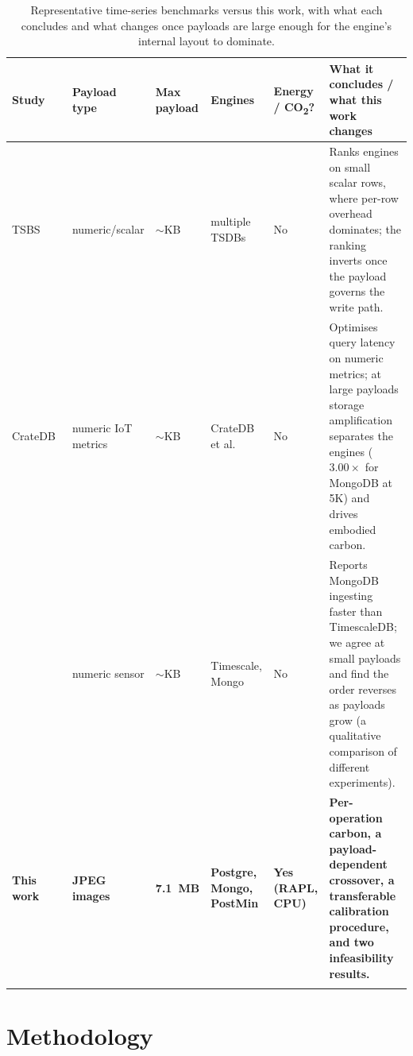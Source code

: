 \documentclass[pdflatex,sn-basic]{sn-jnl}%
\begin{document}
\begin{table}[htbp]
\caption{Representative time-series benchmarks versus this work, with what each concludes and what changes once payloads are large enough for the engine's internal layout to dominate.}\label{tab:relwork}
\footnotesize
\setlength{\tabcolsep}{3pt}
\begin{tabular}{@{}L{0.155\textwidth}L{0.115\textwidth}L{0.065\textwidth}L{0.115\textwidth}L{0.075\textwidth}L{0.315\textwidth}@{}}
\toprule
Study & Payload type & Max payload & Engines & Energy / CO\textsubscript{2}? & What it concludes / what this work changes \\
\midrule
TSBS~\citep{tsbs} & numeric/scalar & $\sim$KB & multiple TSDBs & No & Ranks engines on small scalar rows, where per-row overhead dominates; the ranking inverts once the payload governs the write path. \\
CrateDB~\citep{cratedb_ts_benchmark} & numeric IoT metrics & $\sim$KB & CrateDB et al. & No & Optimises query latency on numeric metrics; at large payloads storage amplification separates the engines ($3.00\times$ for MongoDB at 5K) and drives embodied carbon. \\
\citet{diva_timescaledb_mongodb_eval} & numeric sensor & $\sim$KB & Timescale, Mongo & No & Reports MongoDB ingesting faster than TimescaleDB; we agree at small payloads and find the order reverses as payloads grow (a qualitative comparison of different experiments). \\
\textbf{This work} & \textbf{JPEG images} & \textbf{7.1~MB} & \textbf{Postgre, Mongo, PostMin} & \textbf{Yes (RAPL, CPU)} & \textbf{Per-operation carbon, a payload-dependent crossover, a transferable calibration procedure, and two infeasibility results.} \\
\botrule
\end{tabular}
\end{table}

\section{Methodology}\label{sec:methodology}
\end{document}
